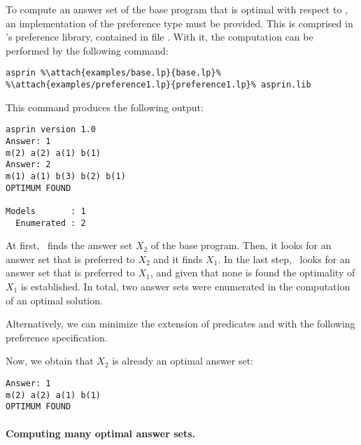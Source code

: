 \begin{example}
To compute an answer set of the base program that is optimal with respect to , 
an implementation of the preference type  must be provided.
This is comprised in \asprin's preference library,
contained in file .
With it, the computation can be performed by the following command:
%
%
\begin{lstlisting}[numbers=none,escapechar=\%]
asprin %\attach{examples/base.lp}{base.lp}% %\attach{examples/preference1.lp}{preference1.lp}% asprin.lib
\end{lstlisting}
%
This command produces the following output:
%
\begin{lstlisting}[numbers=none]
asprin version 1.0
Answer: 1
m(2) a(2) a(1) b(1)
Answer: 2
m(1) a(1) b(3) b(2) b(1)
OPTIMUM FOUND

Models       : 1
  Enumerated : 2

\end{lstlisting}
%
At first, \asprin\ finds the answer set $X_2$ of the base program. 
Then, it looks for an answer set that is preferred to $X_2$ and it finds $X_1$. 
In the last step, \asprin\ looks for an answer set that is preferred to $X_1$,  
and given that none is found the optimality of $X_1$ is established. 
In total, two answer sets were enumerated in the computation of an optimal solution.

Alternatively,
we can minimize the extension of predicates  and  with the following preference specification.
%

%
Now, we obtain that $X_2$ is already an optimal answer set: 
\begin{lstlisting}[numbers=none]
Answer: 1
m(2) a(2) a(1) b(1)
OPTIMUM FOUND
\end{lstlisting}
\end{example}

\paragraph{Computing many optimal answer sets.}

